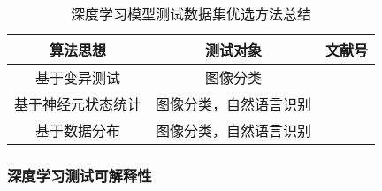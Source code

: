 \begin{table}[t]
	\small
	\centering
	\caption{深度学习模型测试数据集优选方法总结}
	\label{tab:testingDataPri}
	\begin{tabular}{ccc}
		\toprule
		\textbf{算法思想} & \textbf{测试对象} & \textbf{文献号} \\
		\midrule
		基于变异测试 & 图像分类 & \cite{Wang2021Prioritizing,Ma2018DeepMutation} \\
		基于神经元状态统计 & 图像分类，自然语言识别 & \cite{Liu2022DeepState,Byun2019Input,Gao2022Adaptive} \\
		基于数据分布 & 图像分类，自然语言识别 & \cite{Shen2020MultipleBoundary,Feng2020DeepGini,Hu2022AnEmpirical} \\
		\bottomrule
	\end{tabular}
\end{table}






\subsubsection{深度学习测试可解释性}

\iffalse
Zhang等人~\citess{zhang2021duo}提出了一种结合模糊测试和差分生成输入的深度学习框架测试方法Duo，用于解释和评估TensorFlow、PyTorch、MNN、MXNet等深度学习框架；也提出了一种基于模糊测试的算子级精度测试方法Predoo~\citess{zhang2021predoo}，用于估计TensorFlow中单个深度学习算子的精度误差。
Hu等人~\citess{Hu2019DeepMutationPlusPlus}提出了一种基于变异测试的DNN工具DeepMutation++，用于对包括前馈神经网络(FNN)和有状态循环神经网络(RNN)在内的DNN的质量评估，不仅可以静态分析DNN模型对整个输入的鲁棒性，还可以通过运行时分析识别顺序输入的易受攻击部分。
Xie等人~\citess{Xie2019DiffChaser}提出了一种自动黑盒测试框架DiffChaser，用于检测深度学习模型在量化、压缩前后的非目标或目标不一致性。
Du等人~\citess{Du2020Marble}提出了的方法Marble构建了一个概率模型，通过抽象来紧凑表征RNN的鲁棒性，用于对基于RNN的深度学习系统进行定量的鲁棒性分析。

Luo等人~\citess{luo2021graph}将算子级别的覆盖指标引入图论，提出了一种基于图的模糊测试方法来捕捉深度学习框架异常、提高深度学习框架质量和可解释性的方法。
Du等人~\citess{Du2019DeepStellar}~\citess{Du2019AQuantitative}提出了一个基于对抗性样本检测和覆盖引导测试生成的深度学习模型测试方法DeepStellar，基于两个轨迹相似性指标和五个覆盖充分性指标对循环神经网络（RNN）进行定量分析和可解释性研究。
Lee等人~\citess{Lee2020Effective}提出了一种对神经网络进行白盒测试的新方法Adapt，通过使神经元选择策略不断地自适应正在进行的测试状态，增强了深度神经网络的可解释性，在覆盖率和对抗性输入方面有有效表现。
Wang等人~\citess{wang2020deepsonar}提出一种识别AI合成假声音的方法DeepSonar，利用对分层神经元激活模式学习来增强深度神经网络在语音识别方面的可解释性，推测真实和AI合成的假声音之间的细微差异，同时也对操纵攻击（例如语音转换和附加现实世界噪声）的情况具有鲁棒性。
\fi



